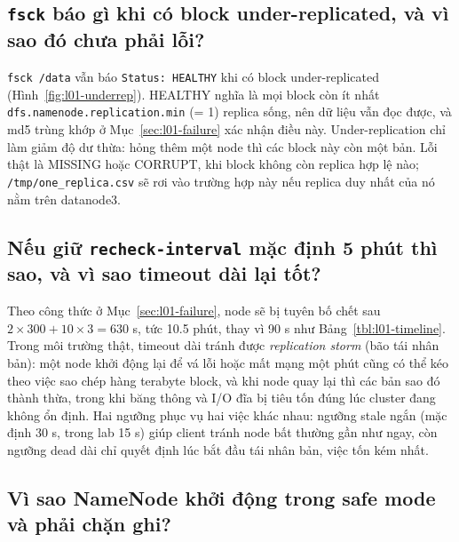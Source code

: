 \documentclass[
  12pt,
  a4paper,
]{article}
\begin{document}
\subsection{\texorpdfstring{\texttt{fsck} báo gì khi có block
under-replicated, và vì sao đó chưa phải
lỗi?}{fsck báo gì khi có block under-replicated, và vì sao đó chưa phải lỗi?}}\label{sec:l01-q5}

\texttt{fsck\ /data} vẫn báo \texttt{Status:\ HEALTHY} khi có block
under-replicated (Hình~\ref{fig:l01-underrep}). HEALTHY nghĩa là mọi
block còn ít nhất
\texttt{dfs.}\allowbreak{}\texttt{namenode.}\allowbreak{}\texttt{replication.}\allowbreak{}\texttt{min}\allowbreak{}
(= 1) replica sống, nên dữ liệu vẫn đọc được, và md5 trùng khớp ở
Mục~\ref{sec:l01-failure} xác nhận điều này. Under-replication chỉ làm
giảm độ dư thừa: hỏng thêm một node thì các block này còn một bản. Lỗi
thật là MISSING hoặc CORRUPT, khi block không còn replica hợp lệ nào;
\texttt{/}\allowbreak{}\texttt{tmp/}\allowbreak{}\texttt{one\_}\allowbreak{}\texttt{replica.}\allowbreak{}\texttt{csv}\allowbreak{}
sẽ rơi vào trường hợp này nếu replica duy nhất của nó nằm trên
datanode3.

\subsection{\texorpdfstring{Nếu giữ
\texttt{recheck-interval}\allowbreak{} mặc định 5 phút thì sao, và vì
sao timeout dài lại
tốt?}{Nếu giữ recheck-interval mặc định 5 phút thì sao, và vì sao timeout dài lại tốt?}}\label{sec:l01-q6}

Theo công thức ở Mục~\ref{sec:l01-failure}, node sẽ bị tuyên bố chết sau
\(2 \times 300 + 10 \times 3 = 630\) s, tức 10.5 phút, thay vì 90 s như
Bảng~\ref{tbl:l01-timeline}. Trong môi trường thật, timeout dài tránh
được \emph{replication storm} (bão tái nhân bản): một node khởi động lại
để vá lỗi hoặc mất mạng một phút cũng có thể kéo theo việc sao chép hàng
terabyte block, và khi node quay lại thì các bản sao đó thành thừa,
trong khi băng thông và I/O đĩa bị tiêu tốn đúng lúc cluster đang không
ổn định. Hai ngưỡng phục vụ hai việc khác nhau: ngưỡng stale ngắn (mặc
định 30 s, trong lab 15 s) giúp client tránh node bất thường gần như
ngay, còn ngưỡng dead dài chỉ quyết định lúc bắt đầu tái nhân bản, việc
tốn kém nhất.

\subsection{Vì sao NameNode khởi động trong safe mode và phải chặn
ghi?}\label{sec:l01-q7}
\end{document}
